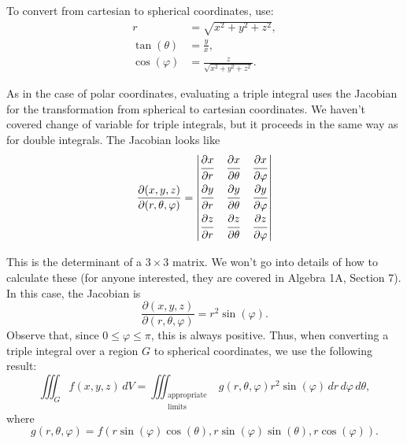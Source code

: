   To convert from cartesian to spherical coordinates, use:
    \begin{align*}
      r & = \sqrt{x^2 + y^2 + z^2},  \\
      \tan(\theta) & = \frac{y}{x},  \\
      \cos(\varphi) & = \frac{z}{\sqrt{x^2 + y^2 + z^2}}.
    \end{align*}
  
  
  
  
  As in the case of polar coordinates, evaluating a triple integral uses the Jacobian for the transformation from spherical to cartesian coordinates.  We haven't covered change of variable for triple integrals, but it proceeds in the same way as for double integrals.  The Jacobian looks like
  \[
    \frac{\partial(x, y, z)}{\partial(r, \theta, \varphi)} = \left|
      \begin{matrix}
        \dfrac{\strut\partial x}{\strut\partial r} & \dfrac{\strut\partial x}{\strut\partial \theta} & \dfrac{\strut\partial x}{\strut\partial \varphi}  \\
        \dfrac{\strut\partial y}{\strut\partial r} & \dfrac{\strut\partial y}{\strut\partial \theta} & \dfrac{\strut\partial y}{\strut\partial \varphi}  \\
        \dfrac{\strut\partial z}{\strut\partial r} & \dfrac{\strut\partial z}{\strut\partial \theta} & \dfrac{\strut\partial z}{\strut\partial \varphi}
      \end{matrix}
      \right|
  \]
  
  This is the determinant of a $3 \times 3$ matrix.  We won't go into details of how to calculate these (for anyone interested, they are covered in Algebra 1A, Section 7).  In this case, the Jacobian is
  \[
    \frac{\partial(x, y, z)}{\partial(r, \theta, \varphi)} = r^2\sin(\varphi).
  \]
  Observe that, since $0 \leq \varphi \leq \pi$, this is always positive.  Thus, when converting a triple integral over a region $G$ to spherical coordinates, we use the following result:
  \[
    \iiint_G f(x, y, z) \, dV = \iiint_{\substack{\text{appropriate}\\ \text{limits}}} g(r, \theta, \varphi)r^2\sin(\varphi) \, dr \, d\varphi \, d\theta,
  \]
  where
  \[
    g(r, \theta, \varphi) = f(r\sin(\varphi)\cos(\theta), r\sin(\varphi)\sin(\theta), r\cos(\varphi)).
  \]
  
